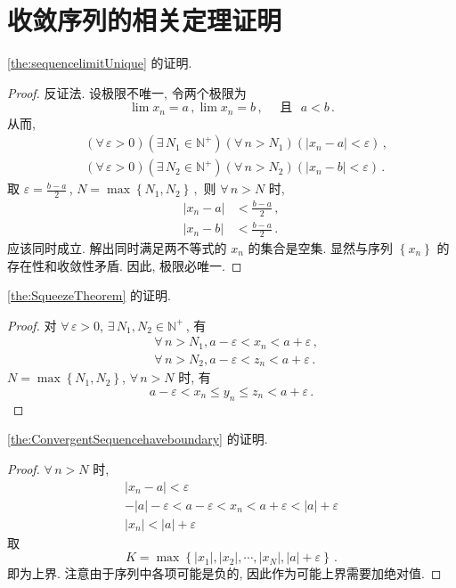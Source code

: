\documentclass{book}
\newcommand{\Exists}{\exists\,}
\newcommand{\Any}{\forall\,}
\newcommand{\set}[1]{\left\{#1\right\}}
\newcommand{\abs}[1]{\left\lvert #1 \right\rvert}
\newcommand{\N}{\mathbb{N}}
\renewcommand{\le}{\leqslant}
\numberwithin{equation}{section}
\numberwithin{figure}{section}
\theoremstyle{definition}
\begin{document}
\section{收敛序列的相关定理证明}
\label{proof:convergentsequencetheorems}
\cref{the:sequencelimitUnique} 的证明.
\begin{proof}
  反证法. 设极限不唯一, 令两个极限为
  \begin{equation*}
    \lim x_n=a\,,\lim x_n=b\,,\quad \text{ 且{} }a<b\,.
  \end{equation*}
  从而, 
  \begin{align*}
    &(\Any \varepsilon>0)(\Exists N_1\in\N^+)(\Any n>N_1)(\abs{x_n-a}<\varepsilon)\,,\\
    &(\Any \varepsilon>0)(\Exists N_2\in\N^+)(\Any n>N_2)(\abs{x_n-b}<\varepsilon)\,.
  \end{align*}
  取 $\varepsilon=\frac{b-a}{2}$\,, $N=\max\set{N_1,N_2}\,,$ 则 $\Any n>N$ 时, 
  \begin{align*}
    \abs{x_n-a}&<\frac{b-a}{2}\,,\\
    \abs{x_n-b}&<\frac{b-a}{2}\,.
  \end{align*}
  应该同时成立. 解出同时满足两不等式的 $x_n$ 的集合是空集. 显然与序列 $\set{x_n}$ 的存在性和收敛性矛盾. 因此, 极限必唯一.
\end{proof}

\cref{the:SqueezeTheorem} 的证明.
\begin{proof}
  对 $\Any \varepsilon>0$, $\Exists N_1,N_2\in\N^+$\,, 有
  \begin{align*}
    &\Any n>N_1,a-\varepsilon<x_n<a+\varepsilon\,,\\
    &\Any n>N_2,a-\varepsilon<z_n<a+\varepsilon\,.
  \end{align*}
  $N=\max\set{N_1,N_2}$, $\Any n>N$ 时, 有
  \begin{equation*}
    a-\varepsilon<x_n\le y_n\le z_n<a+\varepsilon\,.
  \end{equation*}
\end{proof}

\cref{the:ConvergentSequencehaveboundary} 的证明.
\begin{proof}
  $\Any n>N$ 时,
  \begin{gather*}
    \abs{x_n-a}<\varepsilon\\
    -\abs{a}-\varepsilon<a-\varepsilon<x_n<a+\varepsilon<\abs{a}+\varepsilon\\
    \abs{x_n}<\abs{a}+\varepsilon
  \end{gather*}
  取
  \begin{equation*}
    K=\max\set{\abs{x_1},\abs{x_2},\cdots,\abs{x_N},\abs{a}+\varepsilon}\,.
  \end{equation*}
  即为上界. 注意由于序列中各项可能是负的, 因此作为可能上界需要加绝对值.
\end{proof}
\end{document}
